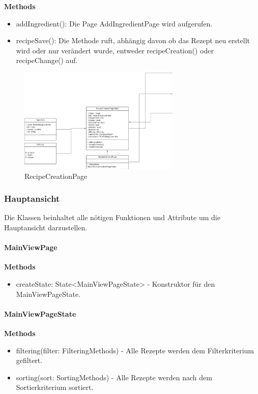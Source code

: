 \documentclass[parskip=full]{scrartcl}
\begin{document}
            \textbf{Methods}
                \begin{itemize}
                    \item addIngredient(): Die Page AddIngredientPage wird aufgerufen.
                    \item recipeSave(): Die Methode ruft, abhängig davon ob das Rezept neu erstellt wird oder nur verändert wurde, entweder recipeCreation() oder recipeChange() auf.
                \end{itemize}

       \begin{figure}[htp]
               \centering
               \includegraphics[height = 50mm]{images/presentationLayer/recipeCreationPage.png}
               \caption{RecipeCreationPage}
        \end{figure}


    \newpage

\subsubsection{Hauptansicht}
        Die Klassen beinhaltet alle nötigen Funktionen und Attribute um die Hauptansicht darzustellen.\newline

        \paragraph{MainViewPage}
            \textbf{Methods}
                \begin{itemize}
                    \item createState: State<MainViewPageState> - Konstruktor für den MainViewPageState.
                \end{itemize}
                
        \paragraph{MainViewPageState}
            \textbf{Methods}
                \begin{itemize}
                    \item filtering(filter: FilteringMethods) - Alle Rezepte werden dem Filterkriterium gefiltert.
                    \item sorting(sort: SortingMethods) - Alle Rezepte werden nach dem Sortierkriterium sortiert.
                \end{itemize}
\end{document}
